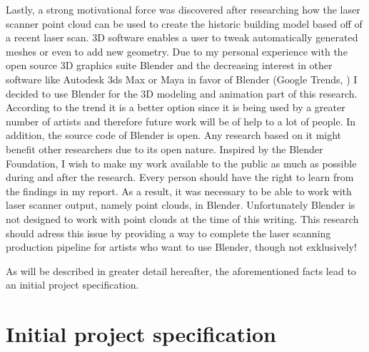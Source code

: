 Lastly, a strong motivational force was discovered after researching how the laser scanner point cloud can be used to create the historic building model based off of a recent laser scan. 3D software enables a user to tweak automatically generated meshes or even to add new geometry. Due to my personal experience with the open source 3D graphics suite Blender and the decreasing interest in other software like Autodesk 3ds Max or Maya in favor of Blender (Google Trends, \parencite{Interest3DSoftware}) I decided to use Blender for the 3D modeling and animation part of this research. According to the trend it is a better option since it is being used by a greater number of artists and therefore future work will be of help to a lot of people. In addition, the source code of Blender is open. Any research based on it might benefit other researchers due to its open nature. Inspired by the Blender Foundation, I wish to make my work available to the public as much as possible during and after the research. Every person should have the right to learn from the findings in my report. As a result, it was necessary to be able to work with laser scanner output, namely point clouds, in Blender. Unfortunately Blender is not designed to work with point clouds at the time of this writing. This research should adress this issue by providing a way to complete the laser scanning production pipeline for artists who want to use Blender, though not exklusively!

As will be described in greater detail hereafter, the aforementioned facts lead to an initial project specification. 

\section{Initial project specification}

